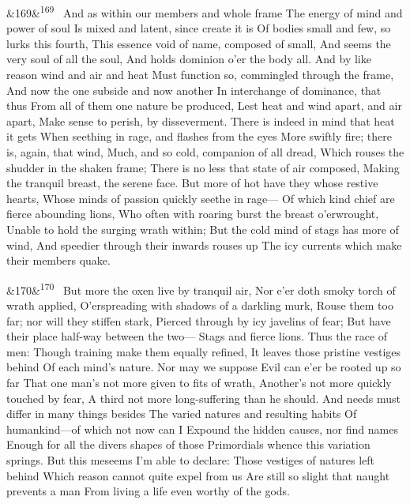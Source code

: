 \documentclass[12pt]{article}
\newcommand{\para}[1][]{\par\noindent\ifx&#1&\else\textsuperscript{\footnotesize #1}~\fi}
\begin{document}
\para[169] And as within our members and whole frame The energy of mind and power of soul Is mixed and latent, since create it is Of bodies small and few, so lurks this fourth, This essence void of name, composed of small, And seems the very soul of all the soul, And holds dominion o'er the body all. And by like reason wind and air and heat Must function so, commingled through the frame, And now the one subside and now another In interchange of dominance, that thus From all of them one nature be produced, Lest heat and wind apart, and air apart, Make sense to perish, by disseverment. There is indeed in mind that heat it gets When seething in rage, and flashes from the eyes More swiftly fire; there is, again, that wind, Much, and so cold, companion of all dread, Which rouses the shudder in the shaken frame; There is no less that state of air composed, Making the tranquil breast, the serene face. But more of hot have they whose restive hearts, Whose minds of passion quickly seethe in rage--- Of which kind chief are fierce abounding lions, Who often with roaring burst the breast o'erwrought, Unable to hold the surging wrath within; But the cold mind of stags has more of wind, And speedier through their inwards rouses up The icy currents which make their members quake.

\para[170] But more the oxen live by tranquil air, Nor e'er doth smoky torch of wrath applied, O'erspreading with shadows of a darkling murk, Rouse them too far; nor will they stiffen stark, Pierced through by icy javelins of fear; But have their place half-way between the two--- Stags and fierce lions. Thus the race of men: Though training make them equally refined, It leaves those pristine vestiges behind Of each mind's nature. Nor may we suppose Evil can e'er be rooted up so far That one man's not more given to fits of wrath, Another's not more quickly touched by fear, A third not more long-suffering than he should. And needs must differ in many things besides The varied natures and resulting habits Of humankind---of which not now can I Expound the hidden causes, nor find names Enough for all the divers shapes of those Primordials whence this variation springs. But this meseems I'm able to declare: Those vestiges of natures left behind Which reason cannot quite expel from us Are still so slight that naught prevents a man From living a life even worthy of the gods.
\end{document}

